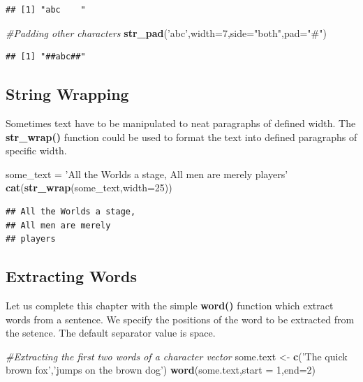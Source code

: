 \documentclass[]{book}
\newenvironment{Shaded}{\begin{snugshade}}{\end{snugshade}}
\newcommand{\KeywordTok}[1]{\textcolor[rgb]{0.13,0.29,0.53}{\textbf{{#1}}}}
\newcommand{\DataTypeTok}[1]{\textcolor[rgb]{0.13,0.29,0.53}{{#1}}}
\newcommand{\DecValTok}[1]{\textcolor[rgb]{0.00,0.00,0.81}{{#1}}}
\newcommand{\StringTok}[1]{\textcolor[rgb]{0.31,0.60,0.02}{{#1}}}
\newcommand{\CommentTok}[1]{\textcolor[rgb]{0.56,0.35,0.01}{\textit{{#1}}}}
\newcommand{\NormalTok}[1]{{#1}}
\begin{document}
\begin{verbatim}
## [1] "abc    "
\end{verbatim}

\begin{Shaded}
\begin{Highlighting}[]
\CommentTok{#Padding other characters}
\KeywordTok{str_pad}\NormalTok{(}\StringTok{'abc'}\NormalTok{,}\DataTypeTok{width=}\DecValTok{7}\NormalTok{,}\DataTypeTok{side=}\StringTok{"both"}\NormalTok{,}\DataTypeTok{pad=}\StringTok{"#"}\NormalTok{)}
\end{Highlighting}
\end{Shaded}

\begin{verbatim}
## [1] "##abc##"
\end{verbatim}

\subsection{String Wrapping}\label{string-wrapping}

Sometimes text have to be manipulated to neat paragraphs of defined
width. The \textbf{str\_wrap()} function could be used to format the
text into defined paragraphs of specific width.

\begin{Shaded}
\begin{Highlighting}[]
\NormalTok{some_text =}\StringTok{ 'All the Worlds a stage, All men are merely players'}
\KeywordTok{cat}\NormalTok{(}\KeywordTok{str_wrap}\NormalTok{(some_text,}\DataTypeTok{width=}\DecValTok{25}\NormalTok{))}
\end{Highlighting}
\end{Shaded}

\begin{verbatim}
## All the Worlds a stage,
## All men are merely
## players
\end{verbatim}

\subsection{Extracting Words}\label{extracting-words}

Let us complete this chapter with the simple \textbf{word()} function
which extract words from a sentence. We specify the positions of the
word to be extracted from the setence. The default separator value is
space.

\begin{Shaded}
\begin{Highlighting}[]
\CommentTok{#Extracting the first two words of a character vector}
\NormalTok{some.text <-}\StringTok{ }\KeywordTok{c}\NormalTok{(}\StringTok{'The quick brown fox'}\NormalTok{,}\StringTok{'jumps on the brown dog'}\NormalTok{)}
\KeywordTok{word}\NormalTok{(some.text,}\DataTypeTok{start =} \DecValTok{1}\NormalTok{,}\DataTypeTok{end=}\DecValTok{2}\NormalTok{)}
\end{Highlighting}
\end{Shaded}
\end{document}
